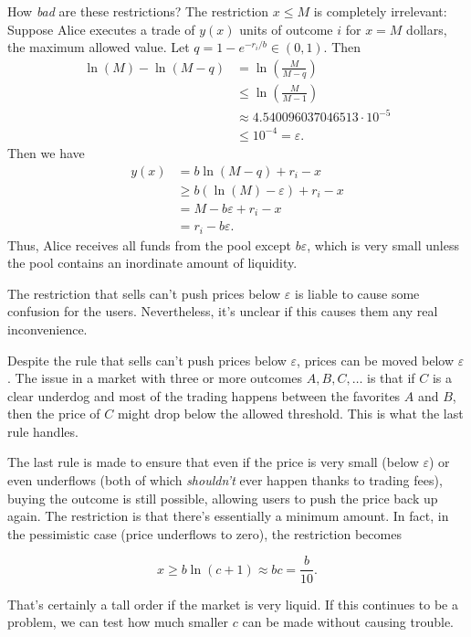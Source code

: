 \documentclass[12pt]{article}
\begin{document}
How \emph{bad} are these restrictions? The restriction $x \leq M$ is completely irrelevant: Suppose Alice executes a trade of $y(x)$ units of outcome $i$ for $x = M$ dollars, the maximum allowed value. Let $q = 1 - e^{-r_i/b} \in (0, 1)$. Then
\begin{align*}
    \ln(M) - \ln(M - q) &= \ln\left(\frac{M}{M - q}\right) \\
    &\leq \ln\left(\frac{M}{M - 1}\right) \\
    &\approx 4.540096037046513 \cdot 10^{-5} \\
    &\leq 10^{-4} = \varepsilon.
\end{align*}
Then we have
\begin{align*}
    y(x) &= b\ln(M - q) + r_i - x \\
    &\geq b(\ln(M) - \varepsilon) + r_i - x \\
    &= M - b\varepsilon + r_i - x \\
    &= r_i - b\varepsilon.
\end{align*}
Thus, Alice receives all funds from the pool except $b \varepsilon$, which is very small unless the pool contains an inordinate amount of liquidity.

The restriction that sells can't push prices below $\varepsilon$ is liable to cause some confusion for the users. Nevertheless, it's unclear if this causes them any real inconvenience.

Despite the rule that sells can't push prices below $\varepsilon$, prices can be moved below $\varepsilon$. The issue in a market with three or more outcomes $A, B, C, \ldots$ is that if $C$ is a clear underdog and most of the trading happens between the favorites $A$ and $B$, then the price of $C$ might drop below the allowed threshold. This is what the last rule handles.

The last rule is made to ensure that even if the price is very small (below $\varepsilon$) or even underflows (both of which \emph{shouldn't} ever happen thanks to trading fees), buying the outcome is still possible, allowing users to push the price back up again. The restriction is that there's essentially a minimum amount. In fact, in the pessimistic case (price underflows to zero), the restriction becomes

$$
x \geq b \ln(c + 1) \approx bc = \frac{b}{10}.
$$

That's certainly a tall order if the market is very liquid. If this continues to be a problem, we can test how much smaller $c$ can be made without causing trouble.
\end{document}
